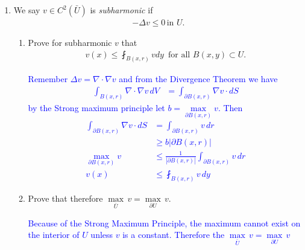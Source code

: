 \documentclass[10pt,a4paper]{report}
\newcommand{\BLUE}[1]{\textcolor{blue}{#1}}
\begin{document}
\begin{description}
\begin{enumerate}
		\BLUE{\begin{align*}
			\Delta v &= \Delta u(Ox) \\
			Ox_j &= \sum_{k=1}^n a_{kj}x_j\\
			\PART{u(Ox_j)}{x_j} &= \sum_{k=1}^n \PART{u}{x_k}\PART{a_{kj}x_j}{x_j}\\
			&= \sum_{k=1}^n \PART{u}{x_k}a_{kj}\\
			\frac{\partial^2 u(Ox_j)}{\partial^2x_j}  &= \PART{}{x_j}\PAREN{\sum_{k=1}^n \PART{u}{x_k}a_{kj}} \\
			&= \sum_{k=1}^n \PART{}{x_j}\PAREN{\PART{u}{x_k}a_{kj}} \\
			&= \sum_{k=1}^n a_{kj}\PART{}{x_j}\PART{u}{x_k} \\
			&= \sum_{k=1}^n a_{kj} 
		\end{align*}
		}
		
		\setcounter{enumi}{4}
		\item We say $v \in C^2(\bar{U})$ is \textit{subharmonic} if
		\begin{align*}
			-\Delta v \le 0\, \text{in } U.
		\end{align*}
		\begin{enumerate}[label=(\alph*)]
			\item Prove for subharmonic $v$ that
			\begin{align*}
				v(x) \le \fint_{B(x,r)} v dy \, \text{ for all } B(x,y) \subset U.
			\end{align*}
			
			\BLUE{Remember $\Delta v = \nabla \cdot \nabla v$ and from the Divergence Theorem we have
			\begin{align*}
				\int_{B(x,r)} \nabla \cdot \nabla v\, dV &= \int_{\partial B(x,r)} \nabla v\cdot dS 
			\end{align*}by the Strong maximum principle let $b = \underset{\partial B(x,r)}\max  v$.  Then
			\begin{align*}
				\int_{\partial B(x,r)} \nabla v\cdot dS  &= \int_{\partial B(x,r)} v \,dr\\
				&\ge b|{\partial B(x,r)}| \\
				\max_{\partial B(x,r)} v &\le \frac{1}{|{\partial B(x,r)}|}\int_{\partial B(x,r)} v \,dr \\
				v(x) &\le \fint_{B(x,r)} v\, dy
			\end{align*}
			}
			\item Prove that therefore $\underset{\bar{U}}\max \,v = \underset{\partial U}\max\, v$.
			
			\BLUE{Because of the Strong Maximum Principle, the maximum cannot exist on the interior of $U$ unless $v$ is a constant.  Therefore the $\underset{\bar{U}}\max \,v = \underset{\partial U}\max\, v$
			}
			

\end{enumerate}
\end{enumerate}
\end{description}
\end{document}
